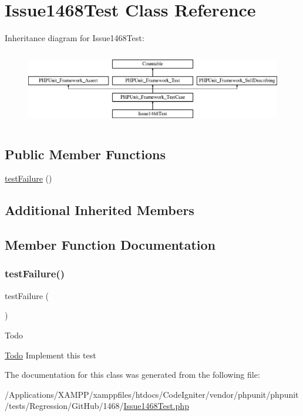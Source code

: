 \hypertarget{class_issue1468_test}{}\section{Issue1468\+Test Class Reference}
\label{class_issue1468_test}
Inheritance diagram for Issue1468\+Test\+:\begin{figure}[H]
\begin{center}
\leavevmode
\includegraphics[height=3.303835cm]{class_issue1468_test}
\end{center}
\end{figure}
\subsection*{Public Member Functions}
\begin{DoxyCompactItemize}
\item 
\mbox{\hyperlink{class_issue1468_test_ab4995640dd47ccdf177deb72344da9e0}{test\+Failure}} ()
\end{DoxyCompactItemize}
\subsection*{Additional Inherited Members}


\subsection{Member Function Documentation}
\mbox{\label{class_issue1468_test_ab4995640dd47ccdf177deb72344da9e0}} 
\subsubsection{\texorpdfstring{test\+Failure()}{testFailure()}}
{\footnotesize\ttfamily test\+Failure (\begin{DoxyParamCaption}{ }\end{DoxyParamCaption})}

\begin{DoxyRefDesc}{Todo}
\item[\mbox{\hyperlink{todo__todo000017}{Todo}}]Implement this test \end{DoxyRefDesc}


The documentation for this class was generated from the following file\+:\begin{DoxyCompactItemize}
\item 
/\+Applications/\+X\+A\+M\+P\+P/xamppfiles/htdocs/\+Code\+Igniter/vendor/phpunit/phpunit/tests/\+Regression/\+Git\+Hub/1468/\mbox{\hyperlink{_issue1468_test_8php}{Issue1468\+Test.\+php}}\end{DoxyCompactItemize}
